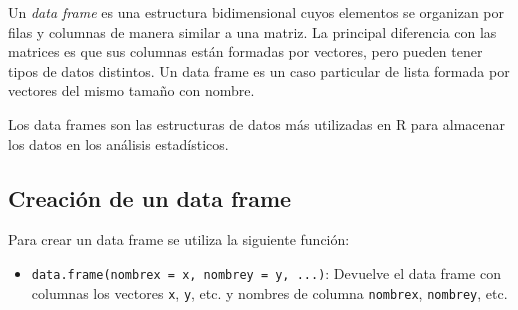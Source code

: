 \documentclass[
  a4paper,
]{scrreport}
\providecommand{\tightlist}{%
  \setlength{\itemsep}{0pt}\setlength{\parskip}{0pt}}\usepackage{longtable,booktabs,array}
\theoremstyle{definition}
\theoremstyle{definition}
\theoremstyle{remark}
\begin{document}
Un \emph{data frame} es una estructura bidimensional cuyos elementos se
organizan por filas y columnas de manera similar a una matriz. La
principal diferencia con las matrices es que sus columnas están formadas
por vectores, pero pueden tener tipos de datos distintos. Un data frame
es un caso particular de lista formada por vectores del mismo tamaño con
nombre.

Los data frames son las estructuras de datos más utilizadas en R para
almacenar los datos en los análisis estadísticos.

\hypertarget{creaciuxf3n-de-un-data-frame}{%
\subsection{Creación de un data
frame}\label{creaciuxf3n-de-un-data-frame}}

Para crear un data frame se utiliza la siguiente función:

\begin{itemize}
\tightlist
\item
  \texttt{data.frame(nombrex\ =\ x,\ nombrey\ =\ y,\ ...)}: Devuelve el
  data frame con columnas los vectores \texttt{x}, \texttt{y}, etc. y
  nombres de columna \texttt{nombrex}, \texttt{nombrey}, etc.
\end{itemize}
\end{document}

